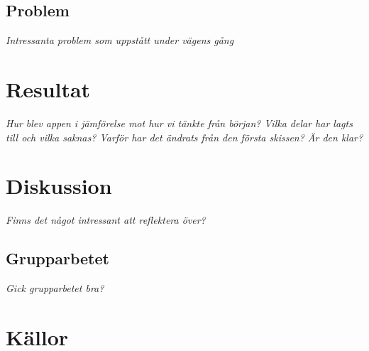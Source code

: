 \documentclass[12pt,a4paper]{article}
\begin{document}
\subsection{Problem}
\textit{Intressanta problem som uppstått under vägens gång}
\section{Resultat}
\textit{Hur blev appen i jämförelse mot hur vi tänkte från början? Vilka delar har lagts till och vilka saknas? Varför har det ändrats från den första skissen? Är den klar?}
\section{Diskussion}
\textit{Finns det något intressant att reflektera över?}
\subsection{Grupparbetet}
\textit{Gick grupparbetet bra?}
\section{Källor}
\appendix
\end{document}
